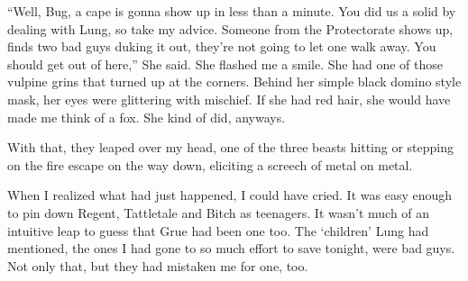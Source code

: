 ``Well, Bug, a cape is gonna show up in less than a minute.  You did us a solid by dealing with Lung, so take my advice.  Someone from the Protectorate shows up, finds two bad guys duking it out, they're not going to let one walk away.  You should get out of here,''  She said.  She flashed me a smile.  She had one of those vulpine grins that turned up at the corners.  Behind her simple black domino style mask, her eyes were glittering with mischief.  If she had red hair, she would have made me think of a fox.  She kind of did, anyways.



With that, they leaped over my head, one of the three beasts hitting or stepping on the fire escape on the way down, eliciting a screech of metal on metal.



When I realized what had just happened, I could have cried.  It was easy enough to pin down Regent, Tattletale and Bitch as teenagers.  It wasn't much of an intuitive leap to guess that Grue had been one too.  The `children' Lung had mentioned, the ones I had gone to so much effort to save tonight, were bad guys.  Not only that, but they had mistaken me for one, too.





